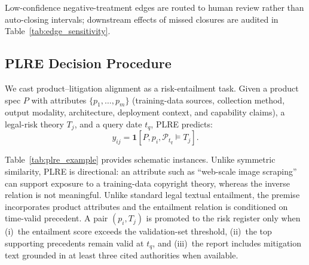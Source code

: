 Low-confidence negative-treatment edges are routed to human review rather than auto-closing intervals; downstream effects of missed closures are audited in Table~\ref{tab:edge_sensitivity}.

\subsection{PLRE Decision Procedure}
\label{sec:plre}

We cast product--litigation alignment as a risk-entailment task. Given a product spec $P$ with attributes $\{p_1,\dots,p_m\}$ (training-data sources, collection method, output modality, architecture, deployment context, and capability claims), a legal-risk theory $T_j$, and a query date $t_q$, PLRE predicts:
\begin{equation}
  y_{ij}=\mathbf{1}[P,p_i,\mathcal{P}_{t_q} \models T_j].
\end{equation}
\begin{table}[t]
\centering
\caption{Schematic PLRE instances (illustrative; not drawn from VIGIL-Dataset). The same attribute--theory pair can be positive or negative depending on whether its supporting authority is still operative at $t_q$.}
\label{tab:plre_example}
\small
\setlength{\tabcolsep}{3pt}
\end{table}

Table~\ref{tab:plre_example} provides schematic instances. Unlike symmetric similarity, PLRE is directional: an attribute such as ``web-scale image scraping'' can support exposure to a training-data copyright theory, whereas the inverse relation is not meaningful. Unlike standard legal textual entailment, the premise incorporates product attributes and the entailment relation is conditioned on time-valid precedent. A pair $(p_i,T_j)$ is promoted to the risk register only when (i)~the entailment score exceeds the validation-set threshold, (ii)~the top supporting precedents remain valid at $t_q$, and (iii)~the report includes mitigation text grounded in at least three cited authorities when available.


